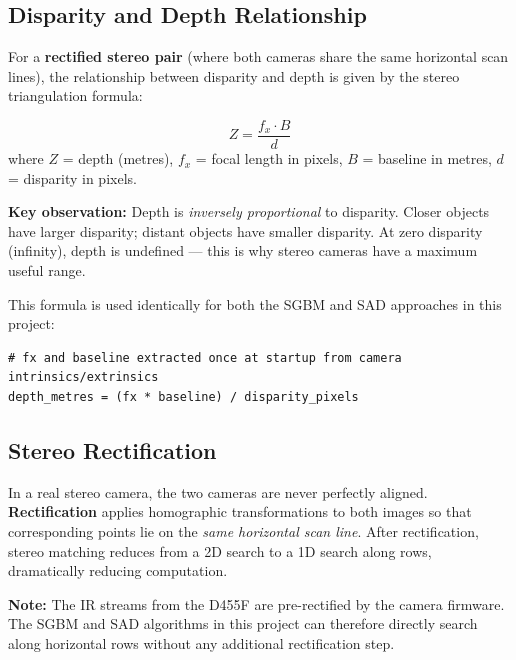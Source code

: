 \documentclass[12pt, a4paper]{article}
\begin{document}
\subsection{Disparity and Depth Relationship}

For a \textbf{rectified stereo pair} (where both cameras share the same
horizontal scan lines), the relationship between disparity and depth is given by
the stereo triangulation formula:

\begin{formulabox}
\begin{equation}
  Z = \frac{f_x \cdot B}{d}
\end{equation}
where $Z$ = depth (metres), $f_x$ = focal length in pixels, $B$ = baseline in
metres, $d$ = disparity in pixels.
\end{formulabox}

\textbf{Key observation:} Depth is \emph{inversely proportional} to disparity.
Closer objects have larger disparity; distant objects have smaller disparity. At
zero disparity (infinity), depth is undefined --- this is why stereo cameras
have a maximum useful range.

This formula is used identically for both the SGBM and SAD approaches in this
project:

\begin{lstlisting}[caption={Disparity to depth conversion (live\_stream.py)}]
# fx and baseline extracted once at startup from camera intrinsics/extrinsics
depth_metres = (fx * baseline) / disparity_pixels
\end{lstlisting}

\subsection{Stereo Rectification}

In a real stereo camera, the two cameras are never perfectly aligned.
\textbf{Rectification} applies homographic transformations to both images so
that corresponding points lie on the \emph{same horizontal scan line}. After
rectification, stereo matching reduces from a 2D search to a 1D search along
rows, dramatically reducing computation.

\begin{notebox}
\textbf{Note:} The IR streams from the D455F are pre-rectified by the camera
firmware. The SGBM and SAD algorithms in this project can therefore directly
search along horizontal rows without any additional rectification step.
\end{notebox}
\end{document}
